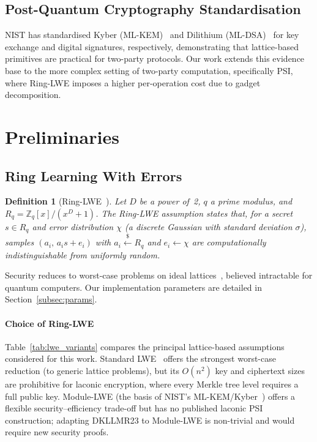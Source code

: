 \documentclass[preprint,12pt]{elsarticle}
\newtheorem{definition}{Definition}
\newcommand{\Rq}{R_q}
\begin{document}
\subsection{Post-Quantum Cryptography Standardisation}

NIST has standardised Kyber (ML-KEM)~\cite{nist2022mlkem} and
Dilithium (ML-DSA)~\cite{nist2022mldsa} for key exchange and digital
signatures, respectively, demonstrating that lattice-based primitives are
practical for two-party protocols. Our work extends this evidence base to the
more complex setting of two-party computation, specifically PSI, where
Ring-LWE imposes a higher per-operation cost due to gadget decomposition.

\section{Preliminaries}
\label{sec:prelim}

\subsection{Ring Learning With Errors}
\label{subsec:rlwe}

\begin{definition}[Ring-LWE~\cite{lyubashevsky2010ring}]
Let $D$ be a power of~2, $q$ a prime modulus, and
$\Rq = \mathbb{Z}_q[x]/(x^D + 1)$.
The Ring-LWE assumption states that, for a secret $s \in \Rq$ and error
distribution $\chi$ (a discrete Gaussian with standard deviation $\sigma$),
samples $(a_i,\, a_i s + e_i)$ with $a_i \xleftarrow{\$} \Rq$ and
$e_i \leftarrow \chi$ are computationally indistinguishable from uniformly
random.
\end{definition}

Security reduces to worst-case problems on ideal lattices~\cite{peikert2016decade},
believed intractable for quantum computers. Our implementation parameters are
detailed in Section~\ref{subsec:params}.

\paragraph{Choice of Ring-LWE}
Table~\ref{tab:lwe_variants} compares the principal lattice-based assumptions
considered for this work. Standard LWE~\cite{regev2009lattices} offers the strongest worst-case
reduction (to generic lattice problems), but its $O(n^2)$ key and ciphertext
sizes are prohibitive for laconic encryption, where every Merkle tree level
requires a full public key. Module-LWE (the basis of NIST's
ML-KEM/Kyber~\cite{nist2022mlkem}) offers a flexible security--efficiency
trade-off but has no published laconic PSI construction; adapting DKLLMR23 to
Module-LWE is non-trivial and would require new security proofs.
\end{document}
